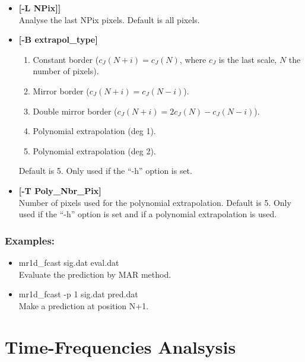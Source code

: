 \begin{itemize}
\begin{verbatim}
  for j = 0 to Number_of_scale-1 do T[j] = AR order at scale j    
\end{verbatim}
\item {\bf[-L NPix]]} \\
Analyse the last NPix pixels. Default is all pixels.
\item {\bf [-B extrapol\_type]}
{\small
\begin{enumerate}
\item Constant border ($c_J(N+i) = c_J(N)$, where $c_J$ is the last scale,
$N$ the number of pixels).
\item Mirror border ($c_J(N+i) = c_J(N-i)$).
\item Double mirror border ($c_J(N+i) = 2 c_J(N) - c_J(N-i)$).
\item Polynomial extrapolation (deg 1).
\item Polynomial extrapolation (deg 2).
\end{enumerate}}
Default is 5. Only used if the ``-h'' option is set.
\item {\bf[-T Poly\_Nbr\_Pix]} \\
Number of pixels used for the polynomial extrapolation.
Default is 5. Only used if the ``-h'' option is set and if a polynomial
extrapolation is used.
\end{itemize}
\subsubsection*{Examples:}
\begin{itemize}
\item mr1d\_fcast sig.dat eval.dat \\
Evaluate the prediction by MAR method.
\item mr1d\_fcast -p 1 sig.dat pred.dat \\
Make a prediction at position N+1.
\end{itemize}

 
\section{Time-Frequencies Analsysis}  

